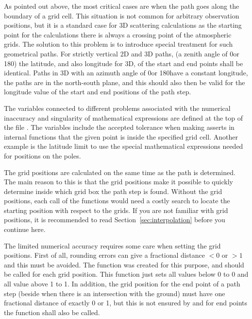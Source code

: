 As pointed out above, the most critical cases are when the path goes
along the boundary of a grid cell. This situation is not common for
arbitrary observation positions, but it is a standard case for 3D
scattering calculations as the starting point for the calculations
there is always a crossing point of the atmospheric grids. The
solution to this problem is to introduce special treatment for such
geometrical paths. For strictly vertical 2D and 3D paths, (a zenith
angle of 0\degree or 180\degree) the latitude, and also longitude for
3D, of the start and end points shall be identical. Paths in 3D with
an azimuth angle of 0\degree or 180\degree have a constant longitude,
the paths are in the north-south plane, and this should also then be
valid for the longitude value of the start and end positions of the
path step.

The variables connected to different problems associated with the
numerical inaccuracy and singularity of mathematical expressions are
defined at the top of the file . The variables
include the accepted tolerance when making asserts in internal
functions that the given point is inside the specified grid cell.
Another example is the latitude limit to use the special mathematical
expressions needed for positions on the poles.




The grid positions are calculated on the same time as the path is
determined. The main reason to this is that the grid positions make it
possible to quickly determine inside which grid box the path step is
found. Without the grid positions, each call of the functions would
need a costly search to locate the starting position with respect to
the grids. If you are not familiar with grid positions, it is
recommended to read Section~\ref{sec:interpolation} before you
continue here.

The limited numerical accuracy requires some care when setting the
grid positions. First of all, rounding errors can give a fractional
distance $< 0$ or $> 1$ and this must be avoided. The function
 was created for this purpose, and
should be called for each grid position. This function just
sets all values below 0 to 0 and all value above 1 to 1. In addition,
the grid position for the end point of a path step (beside when there
is an intersection with the ground) must have one fractional
distance of exactly 0 or 1, but this is not ensured by
 and for end points the function
 shall also be called.

